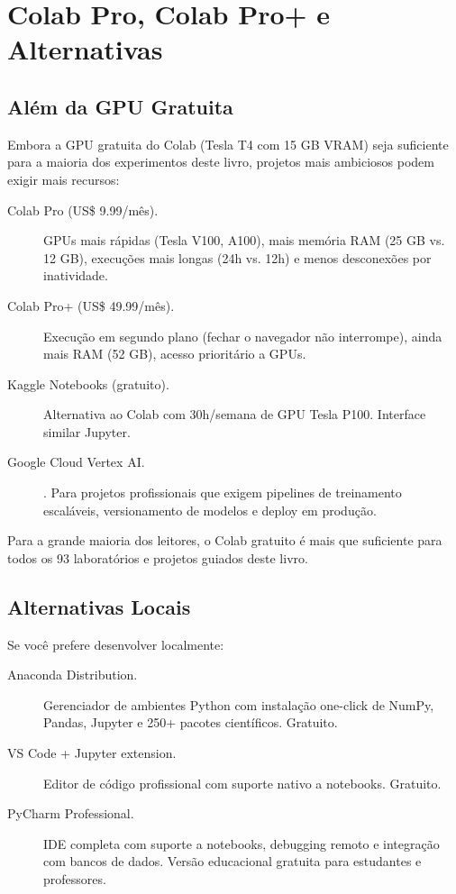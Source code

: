 \section{Colab Pro, Colab Pro+ e Alternativas}

\subsection{Além da GPU Gratuita}

Embora a GPU gratuita do Colab (Tesla T4 com 15 GB VRAM) seja suficiente para a maioria dos experimentos deste livro, projetos mais ambiciosos podem exigir mais recursos:

\begin{description}
    \item[Colab Pro (US\$ 9.99/mês).] GPUs mais rápidas (Tesla V100, A100), mais memória RAM (25 GB vs. 12 GB), execuções mais longas (24h vs. 12h) e menos desconexões por inatividade.
    \item[Colab Pro+ (US\$ 49.99/mês).] Execução em segundo plano (fechar o navegador não interrompe), ainda mais RAM (52 GB), acesso prioritário a GPUs.
    \item[Kaggle Notebooks (gratuito).] Alternativa ao Colab com 30h/semana de GPU Tesla P100. Interface similar Jupyter.
    \item[Google Cloud Vertex AI.]. Para projetos profissionais que exigem pipelines de treinamento escaláveis, versionamento de modelos e deploy em produção.
\end{description}

Para a grande maioria dos leitores, o Colab gratuito é mais que suficiente para todos os 93 laboratórios e projetos guiados deste livro.

\subsection{Alternativas Locais}

Se você prefere desenvolver localmente:

\begin{description}
    \item[Anaconda Distribution.] Gerenciador de ambientes Python com instalação one-click de NumPy, Pandas, Jupyter e 250+ pacotes científicos. Gratuito.
    \item[VS Code + Jupyter extension.] Editor de código profissional com suporte nativo a notebooks. Gratuito.
    \item[PyCharm Professional.] IDE completa com suporte a notebooks, debugging remoto e integração com bancos de dados. Versão educacional gratuita para estudantes e professores.
\end{description}

